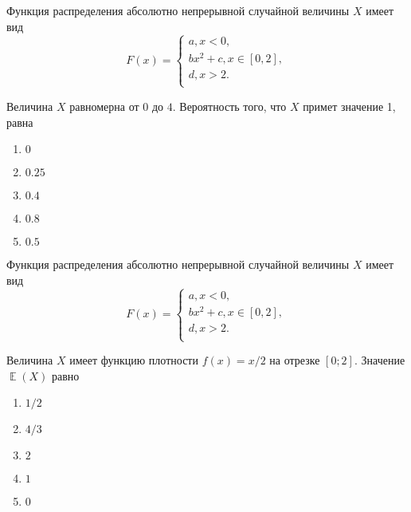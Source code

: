 \documentclass[t]{beamer}
\DeclareMathOperator{\E}{\mathbb{E}}
\begin{document}
 \begin{frame} \label{18} 
\begin{block}{18} 

Функция распределения абсолютно непрерывной случайной величины $X$ имеет вид
\[
F(x)=\begin{cases}
a, x<0,\\
b x^2+c, x \in [0,2],\\
d, x > 2.\\
\end{cases}
\]
\vspace{0.2cm} 
 
 Величина $X$ равномерна от $0$ до $4$. Вероятность того, что $X$ примет значение 1, равна
 


 \end{block} 
\begin{enumerate} 
\item[] \hyperlink{18-Yes}{\beamergotobutton{} $0$}
\item[] \hyperlink{18-No}{\beamergotobutton{} $0.25$}
\item[] \hyperlink{18-No}{\beamergotobutton{} $0.4$}
\item[] \hyperlink{18-No}{\beamergotobutton{} $0.8$
}
\item[] \hyperlink{18-No}{\beamergotobutton{} $0.5$}
\end{enumerate} 
\end{frame} 


 \begin{frame} \label{19} 
\begin{block}{19} 

Функция распределения абсолютно непрерывной случайной величины $X$ имеет вид
\[
F(x)=\begin{cases}
a, x<0,\\
b x^2+c, x \in [0,2],\\
d, x > 2.\\
\end{cases}
\]
\vspace{0.2cm} 
 
Величина $X$ имеет функцию плотности $f(x)=x/2$ на отрезке $[0;2]$. Значение $\E(X)$  равно
 


 \end{block} 
\begin{enumerate} 
\item[] \hyperlink{19-No}{\beamergotobutton{} $1/2$}
\item[] \hyperlink{19-Yes}{\beamergotobutton{} $4/3$}
\item[] \hyperlink{19-No}{\beamergotobutton{} $2$
}
\item[] \hyperlink{19-No}{\beamergotobutton{} $1$}
\item[] \hyperlink{19-No}{\beamergotobutton{} $0$}
\end{enumerate} 
\end{frame} 
\end{document}
